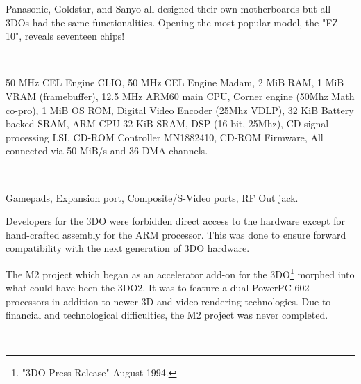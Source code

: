 \par
Panasonic, Goldstar, and Sanyo all designed their own motherboards but all 3DOs had the same functionalities. Opening the most popular model, the "FZ-10", reveals seventeen chips!\\
\par
{}\\
\par
{} 50 MHz CEL Engine CLIO, 
 50 MHz CEL Engine  Madam, 
 2 MiB RAM, 
 1 MiB VRAM (framebuffer), 
 12.5 MHz ARM60 main CPU, 
 Corner engine (50Mhz Math co-pro), 
 1 MiB OS ROM, 
 Digital Video Encoder (25Mhz VDLP), 
 32 KiB Battery backed SRAM,  
 ARM CPU 32 KiB SRAM, 
 DSP (16-bit, 25Mhz), 
 CD signal processing LSI, 
 CD-ROM Controller MN1882410, 
 CD-ROM Firmware, All connected via 50 MiB/s and 36 DMA channels.\\
\par
{}\\
\par
{} Gamepads,
 Expansion port,
 Composite/S-Video ports, 
 RF Out jack. 


\par
Developers for the 3DO were forbidden direct access to the hardware except for hand-crafted assembly for the ARM processor. This was done to ensure forward compatibility with the next generation of 3DO hardware.\\
\par
 The M2 project which began as an accelerator add-on for the 3DO\footnote{"3DO Press Release" August 1994.} morphed into what could have been the 3DO2. It was to feature a dual PowerPC 602 processors in addition to newer 3D and video rendering technologies. Due to financial and technological difficulties, the M2 project was never completed.\\
\par
{}\\
\pagebreak

